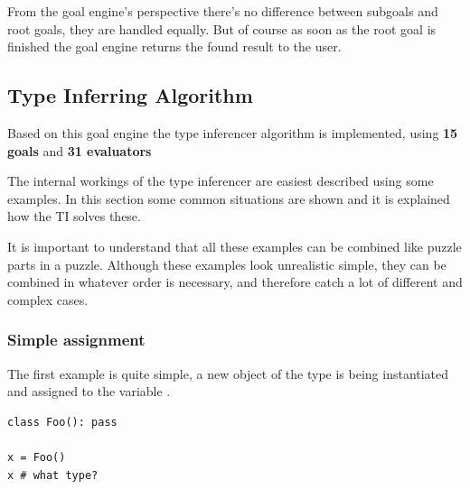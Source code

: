 \documentclass[12pt,halfparskip,DIV11,BCOR10mm]{scrreprt}
\begin{document}
From the goal engine's perspective there's no difference between subgoals and root goals, they are handled equally. But of course as soon as the root goal is finished the goal engine returns the found result to the user.


\subsection{Type Inferring Algorithm}

Based on this goal engine the type inferencer algorithm is implemented, using \textbf{15 goals} and \textbf{31 evaluators}

The internal workings of the type inferencer are easiest described using some examples. In this section some common situations are shown and it is explained how the TI solves these. 

It is important to understand that all these examples can be combined like puzzle parts in a puzzle. Although these examples look unrealistic simple, they can be combined in whatever order is necessary, and therefore catch a lot of different and complex  cases. 


\subsubsection{Simple assignment}

The first example is quite simple, a new object of the type  is being instantiated and assigned to the variable . 

\begin{lstlisting}
class Foo(): pass

x = Foo()
x # what type?
\end{lstlisting}
\end{document}
